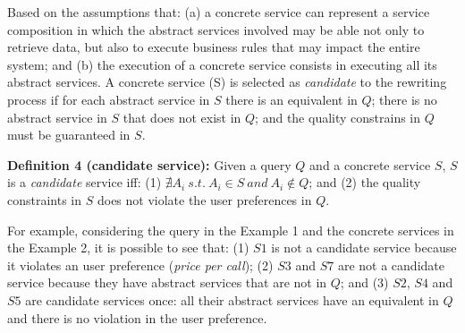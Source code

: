 

Based on the assumptions that: (a) a concrete service can represent a service composition in which the abstract services involved may be able not only to retrieve data, but also to execute business rules that may impact the entire system; and (b) the execution of a concrete service consists in executing all its abstract services.  
A concrete service (S) is selected as \textit{candidate} to the rewriting process if for each abstract service in $S$ there is an equivalent in $Q$; there is no abstract service in $S$ that does not exist in $Q$; and the quality constrains in $Q$ must be guaranteed in $S$.

\noindent \textbf{Definition 4 (candidate service):} Given a query $Q$ and a concrete service $S$, $S$ is a \textit{candidate} service iff: (1) $\nexists A_{i} \ s.t. \ A_{i} \in S \ and \ A_{i} \not\in Q$; and (2) the quality constraints in $S$ does not violate the user preferences in $Q$. 

For example, considering the query in the Example 1 and the concrete services in the Example 2, it is possible to see that:
(1) $S1$ is not a candidate service because it violates an user preference (\textit{price per call});
(2) $S3$ and $S7$ are not a candidate service because they have abstract services that are not in $Q$; and
(3) $S2$, $S4$ and $S5$ are candidate services once: all their abstract services have an equivalent in $Q$ and there is no violation in the user preference.


